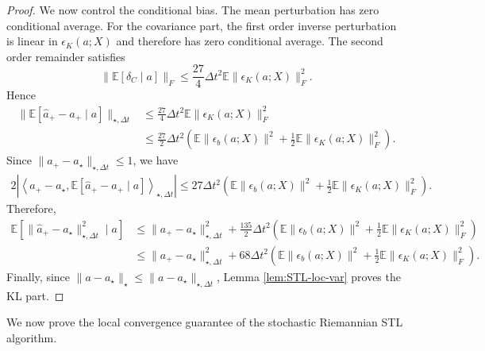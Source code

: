 \documentclass[11pt]{article}
\theoremstyle{plain}
\theoremstyle{definition}
\theoremstyle{remark}
\newcommand{\E}{\mathbb{E}}
\begin{document}
\begin{proof}
    We now control the conditional bias. The mean perturbation has zero conditional average. For the covariance part, the first order inverse perturbation is linear in $\epsilon_K(a;X)$ and therefore has zero conditional average. The second order remainder satisfies
    \begin{equation*}
        \|\E[\delta_C\mid a]\|_F
        \leq
        \frac{27}{4}\Delta t^2
        \E\|\epsilon_K(a;X)\|_F^2.
    \end{equation*}
    Hence
    \begin{align*}
        \|\E[\widehat a_+-a_+\mid a]\|_{\star,\Delta t}
        &\leq
        \frac{27}{4}\Delta t^2
        \E\|\epsilon_K(a;X)\|_F^2 \\
        &\leq
        \frac{27}{2}\Delta t^2
        \left(
            \E\|\epsilon_b(a;X)\|^2
            +
            \frac{1}{2}\E\|\epsilon_K(a;X)\|_F^2
        \right).
    \end{align*}
    Since $\|a_+-a_\star\|_{\star,\Delta t}\leq 1$, we have
    \begin{align*}
        2\left|
            \left\langle 
                a_+-a_\star,
                \E[\widehat a_+-a_+\mid a]
            \right\rangle_{\star,\Delta t}
        \right| \leq
        27\Delta t^2
        \left(
            \E\|\epsilon_b(a;X)\|^2
            +
            \frac{1}{2}\E\|\epsilon_K(a;X)\|_F^2
        \right).
    \end{align*}
    Therefore,
    \begin{align*}
        \E[\|\widehat a_+-a_\star\|_{\star,\Delta t}^2\mid a]
        &\leq
        \|a_+-a_\star\|_{\star,\Delta t}^2 +
        \frac{135}{2}\Delta t^2
        \left(
            \E\|\epsilon_b(a;X)\|^2
            +
            \frac{1}{2}\E\|\epsilon_K(a;X)\|_F^2
        \right) \\
        &\leq
        \|a_+-a_\star\|_{\star,\Delta t}^2
        +
        68\Delta t^2
        \left(
            \E\|\epsilon_b(a;X)\|^2
            +
            \frac{1}{2}\E\|\epsilon_K(a;X)\|_F^2
        \right).
    \end{align*}
    Finally, since $\|a-a_\star\|_\star \leq \|a-a_\star\|_{\star,\Delta t}$, Lemma \ref{lem:STL-loc-var} proves the KL part.
\end{proof}

We now prove the local convergence guarantee of the stochastic Riemannian STL algorithm.
\end{document}
